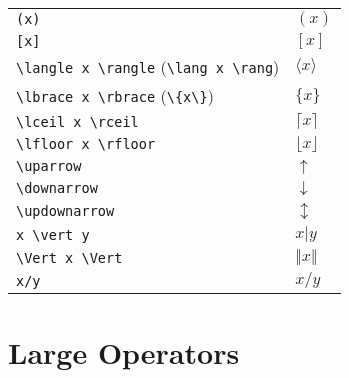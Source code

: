 \documentclass[text,xhtml,itex]{internet}
\begin{document}
\begin{tabular}{ll}
\verb+(x)+                                   & \((x)\) \\
\verb+[x]+                                   & \([x]\) \\
\verb+\langle x \rangle+ (\verb+\lang x \rang+)   & \(\langle x \rangle\) \\
\verb+\lbrace x \rbrace+ (\verb+\{x\}+)           & \(\lbrace x \rbrace\) \\
\verb+\lceil x \rceil+                       & \(\lceil x \rceil\) \\
\verb+\lfloor x \rfloor+                     & \(\lfloor x \rfloor\) \\
\verb+\uparrow+                              & \(\uparrow\) \\
\verb+\downarrow+                            & \(\downarrow\) \\
\verb+\updownarrow+                          & \(\updownarrow\) \\
\verb+x \vert y+                             & \(x \vert y\) \\
\verb+\Vert x \Vert+                         & \(\Vert x \Vert\) \\
\verb+x/y+                                   & \(x/y\)
\end{tabular}

\section{Large Operators}
\end{document}
